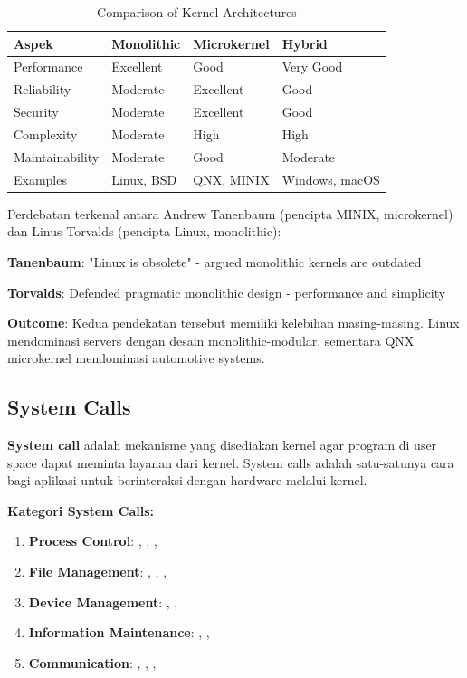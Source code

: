 \begin{table}[htbp]
    \centering
    \caption{Comparison of Kernel Architectures}
    \label{tab:kernel-comparison}
    \begin{tabular}{@{}llll@{}}
        \toprule
        \textbf{Aspek} & \textbf{Monolithic} & \textbf{Microkernel} & \textbf{Hybrid} \\
        \midrule
        Performance & Excellent & Good & Very Good \\
        Reliability & Moderate & Excellent & Good \\
        Security & Moderate & Excellent & Good \\
        Complexity & Moderate & High & High \\
        Maintainability & Moderate & Good & Moderate \\
        Examples & Linux, BSD & QNX, MINIX & Windows, macOS \\
        \bottomrule
    \end{tabular}
\end{table}

\begin{examplebox}
Perdebatan terkenal antara Andrew Tanenbaum (pencipta MINIX, microkernel) dan Linus Torvalds (pencipta Linux, monolithic):

\textbf{Tanenbaum}: "Linux is obsolete" - argued monolithic kernels are outdated

\textbf{Torvalds}: Defended pragmatic monolithic design - performance and simplicity

\textbf{Outcome}: Kedua pendekatan tersebut memiliki kelebihan masing-masing. Linux mendominasi servers dengan desain monolithic-modular, sementara QNX microkernel mendominasi automotive systems.
\end{examplebox}

\subsection{System Calls}

\textbf{System call} adalah mekanisme yang disediakan kernel agar program di user space dapat meminta layanan dari kernel. System calls adalah satu-satunya cara bagi aplikasi untuk berinteraksi dengan hardware melalui kernel.

\textbf{Kategori System Calls:}
\begin{enumerate}
    \item \textbf{Process Control}: , , , 
    \item \textbf{File Management}: , , , 
    \item \textbf{Device Management}: , , 
    \item \textbf{Information Maintenance}: , , 
    \item \textbf{Communication}: , , , 
\end{enumerate}

